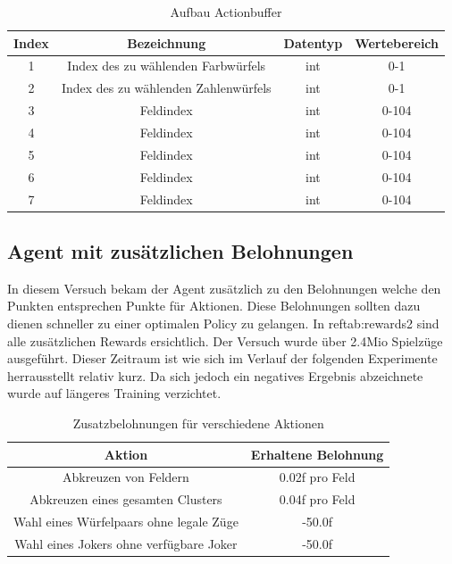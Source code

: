 \begin{table}[!h]
    \centering
    \begin{tabular}{|c|c|c|c|}
    \hline
    \textbf{Index} & \textbf{Bezeichnung} & \textbf{Datentyp} & \textbf{Wertebereich} \\
    \hline
    1 & Index des zu wählenden Farbwürfels & int & 0-1 \\
    \hline
    2 & Index des zu wählenden Zahlenwürfels & int & 0-1 \\
    \hline
    3 & Feldindex & int & 0-104 \\
    \hline
    4 & Feldindex & int & 0-104 \\
    \hline
    5 & Feldindex & int & 0-104 \\
    \hline
    6 & Feldindex & int & 0-104 \\
    \hline
    7 & Feldindex & int & 0-104 \\
    \hline
    \end{tabular}
    \caption{Aufbau Actionbuffer}
    \label{tab:Aufbau Actionbuffer Versuch 1}
\end{table}

\newpage
\subsection{Agent mit zusätzlichen Belohnungen}
In diesem Versuch bekam der Agent zusätzlich zu den Belohnungen welche den Punkten entsprechen Punkte für Aktionen. Diese Belohnungen sollten dazu dienen schneller zu einer optimalen Policy zu gelangen.
In ref{tab:rewards2} sind alle zusätzlichen Rewards ersichtlich. Der Versuch wurde über 2.4Mio Spielzüge ausgeführt. Dieser Zeitraum ist wie sich im Verlauf der folgenden Experimente herrausstellt relativ kurz. Da sich jedoch ein negatives Ergebnis abzeichnete wurde auf längeres Training verzichtet.  

\begin{table}[!htbp]
    \centering
    \begin{tabular}{|c|c|}
    \hline
    \textbf{Aktion} & \textbf{Erhaltene Belohnung} \\
    \hline
    Abkreuzen von Feldern & 0.02f pro Feld \\
    \hline
    Abkreuzen eines gesamten Clusters & 0.04f pro Feld \\
    \hline
    Wahl eines Würfelpaars ohne legale Züge & -50.0f \\
    \hline
    Wahl eines Jokers ohne verfügbare Joker & -50.0f \\
    \hline
    \end{tabular}
    \caption{Zusatzbelohnungen für verschiedene Aktionen}
    \label{tab:rewards2}
\end{table}




